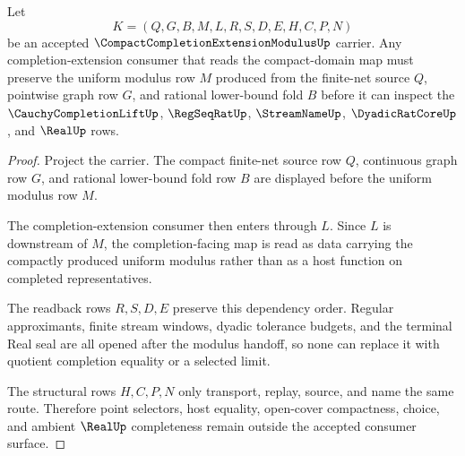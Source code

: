 \begin{theorem}
\label{thm:compact-completion-extension-modulus-preservation}
Let
$$
K=(Q,G,B,M,L,R,S,D,E,H,C,P,N)
$$
be an accepted $\CompactCompletionExtensionModulusUp$ carrier. Any completion-extension consumer that reads the compact-domain map must preserve the uniform modulus row $M$ produced from the finite-net source $Q$, pointwise graph row $G$, and rational lower-bound fold $B$ before it can inspect the $\CauchyCompletionLiftUp$, $\RegSeqRatUp$, $\StreamNameUp$, $\DyadicRatCoreUp$, and $\RealUp$ rows.
\end{theorem}
\begin{proof}
Project the carrier. The compact finite-net source row $Q$, continuous graph row $G$, and rational lower-bound fold row $B$ are displayed before the uniform modulus row $M$.

The completion-extension consumer then enters through $L$. Since $L$ is downstream of $M$, the completion-facing map is read as data carrying the compactly produced uniform modulus rather than as a host function on completed representatives.

The readback rows $R,S,D,E$ preserve this dependency order. Regular approximants, finite stream windows, dyadic tolerance budgets, and the terminal Real seal are all opened after the modulus handoff, so none can replace it with quotient completion equality or a selected limit.

The structural rows $H,C,P,N$ only transport, replay, source, and name the same route. Therefore point selectors, host equality, open-cover compactness, choice, and ambient $\RealUp$ completeness remain outside the accepted consumer surface.
\end{proof}


